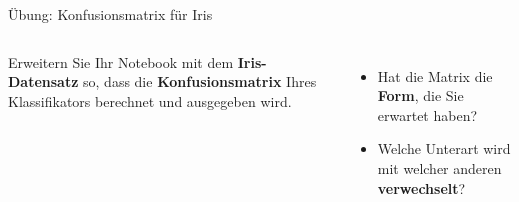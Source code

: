 \begin{frame}{Übung: Konfusionsmatrix für Iris}
\begin{columns}

Erweitern Sie Ihr Notebook mit dem \textbf{Iris-Datensatz} so, dass die
\textbf{Konfusionsmatrix} Ihres Klassifikators berechnet und ausgegeben
wird.

\vspace{0.4em}
\begin{itemize}
  \item Hat die Matrix die \textbf{Form}, die Sie erwartet haben?
  \item Welche Unterart wird mit welcher anderen \textbf{verwechselt}?
\end{itemize}

\centering
{}


\end{columns}
\end{frame}



\makequestionspage{\FRAGENIMAGE}